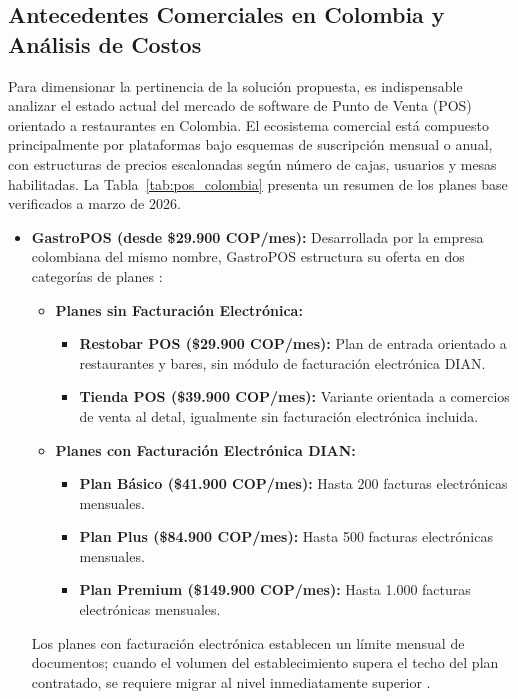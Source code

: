 \subsection{Antecedentes Comerciales en Colombia y Análisis de Costos}

Para dimensionar la pertinencia de la solución propuesta, es indispensable
analizar el estado actual del mercado de software de Punto de Venta (POS)
orientado a restaurantes en Colombia. El ecosistema comercial está compuesto
principalmente por plataformas bajo esquemas de suscripción mensual o anual,
con estructuras de precios escalonadas según número de cajas, usuarios y
mesas habilitadas. La Tabla~\ref{tab:pos_colombia} presenta un resumen de
los planes base verificados a marzo de 2026.

\begin{itemize}
	
\item \textbf{GastroPOS (desde \$29.900 COP/mes):}
Desarrollada por la empresa colombiana del mismo nombre, GastroPOS
estructura su oferta en dos categorías de planes \cite{gastropos}:

\begin{itemize}
	\item \textbf{Planes sin Facturación Electrónica:}
	\begin{itemize}
		\item \textbf{Restobar POS (\$29.900 COP/mes):} Plan de entrada
		orientado a restaurantes y bares, sin módulo de facturación
		electrónica DIAN.
		\item \textbf{Tienda POS (\$39.900 COP/mes):} Variante orientada
		a comercios de venta al detal, igualmente sin facturación
		electrónica incluida.
	\end{itemize}
	\item \textbf{Planes con Facturación Electrónica DIAN:}
	\begin{itemize}
		\item \textbf{Plan Básico (\$41.900 COP/mes):} Hasta 200 facturas
		electrónicas mensuales.
		\item \textbf{Plan Plus (\$84.900 COP/mes):} Hasta 500 facturas
		electrónicas mensuales.
		\item \textbf{Plan Premium (\$149.900 COP/mes):} Hasta 1.000
		facturas electrónicas mensuales.
	\end{itemize}
\end{itemize}

Los planes con facturación electrónica establecen un límite mensual de
documentos; cuando el volumen del establecimiento supera el techo del
plan contratado, se requiere migrar al nivel inmediatamente superior
\cite{gastropos}.
	

\end{itemize}
